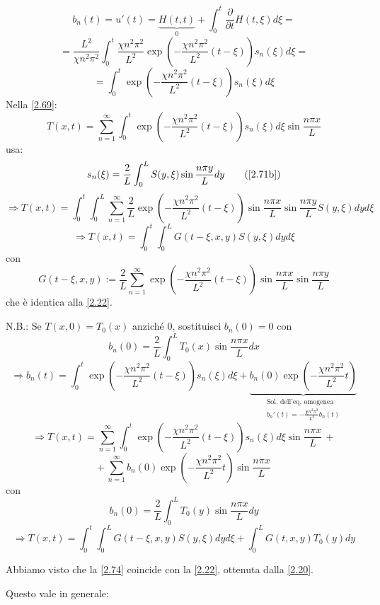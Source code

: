 \documentclass[a4paper,11pt]{report}
\begin{document}
\[
b_n(t) = u'(t) = \underbrace{H(t,t)}_{0} + \int_0^t \frac{\partial}{\partial t}H(t,\xi)d\xi = 
\]
\[
=\frac{L^2}{\chi n^2\pi^2}\int_0^t \frac{\chi n^2 \pi^2}{L^2}\exp \left(-\frac{\chi n^2 \pi^2}{L^2}(t-\xi)\right) s_n(\xi)d\xi =
\]
\[
=\int_0^t \exp \left(-\frac{\chi n^2 \pi^2}{L^2}(t-\xi)\right) s_n(\xi)d\xi
\]
Nella \eqref{2.69}:
\[
T(x,t)=\sum_{n=1}^{\infty}\int_0^t\exp \left(-\frac{\chi n^2 \pi^2}{L^2}(t-\xi)\right) s_n(\xi)d\xi \sin\frac{n\pi x}{L}
\]
usa:
\begin{equation}
s_n(\xi)=\frac{2}{L}\int_0^L S(y,\xi) \sin \frac{n\pi y}{L}dy
\tag{\ref{2.71b}}
\end{equation}
\[
\Rightarrow T(x,t)=\int_0^t \int_0^L \sum_{n=1}^{\infty}\frac{2}{L}\exp \left(-\frac{\chi n^2 \pi^2}{L^2}(t-\xi)\right) \sin \frac{n\pi x}{L}\sin \frac{n\pi y}{L} S(y,\xi)dyd\xi
\]
\begin{equation}
\Rightarrow T(x,t)=\int_0^t \int_0^L G(t-\xi,x,y)S(y,\xi)dyd\xi
\end{equation}
con
\begin{equation}
G(t-\xi,x,y):=\frac{2}{L}\sum_{n=1}^{\infty}\exp \left(-\frac{\chi n^2 \pi^2}{L^2}(t-\xi)\right) \sin \frac{n\pi x}{L}\sin \frac{n\pi y}{L}
\label{2.74}
\end{equation}
che \`e identica alla \eqref{2.22}.

\medskip

N.B.: Se $T(x,0)=T_0(x)$ anzich\'e 0, sostituisci $ b_n(0)=0$ con
\[
b_n(0)=\frac{2}{L}\int_0^L T_0(x)\sin\frac{n\pi x}{L}dx
\]
\[
\Rightarrow b_n(t)=\int_0^t\exp\left(-\frac{\chi n^2 \pi^2}{L^2}(t-\xi)\right)s_n(\xi)d\xi + \underbrace{b_n(0)\exp\left(-\frac{\chi n^2 \pi^2}{L^2}t\right)}_{\substack{\text{Sol. dell'eq. omogenea} \\ b_n'(t)=-\frac{\chi n^2 \pi^2}{L^2}b_n(t)}}
\]
\[
\Rightarrow T(x,t) = \sum_{n=1}^\infty \int_0^t\exp\left(-\frac{\chi n^2 \pi^2}{L^2}(t-\xi)\right)s_n(\xi)d\xi\sin\frac{n\pi x}{L}\,+
\]
\[
+\,\sum_{n=1}^\infty b_n(0)\exp\left(-\frac{\chi n^2 \pi^2}{L^2}t\right)\sin\frac{n\pi x}{L}
\]
con
\[
b_n(0)=\frac{2}{L}\int^L_0 T_0(y)\sin\frac{n\pi x}{L}dy
\]
\begin{equation}
\Rightarrow T(x,t)=\int_0^t \int_0^L G(t-\xi,x,y)S(y,\xi)dyd\xi + \int_0^L G(t,x,y)T_0(y)dy
\end{equation}

Abbiamo visto che la \eqref{2.74} coincide con la \eqref{2.22}, ottenuta dalla \eqref{2.20}. 

\medskip

Questo vale in generale: 
\end{document}
